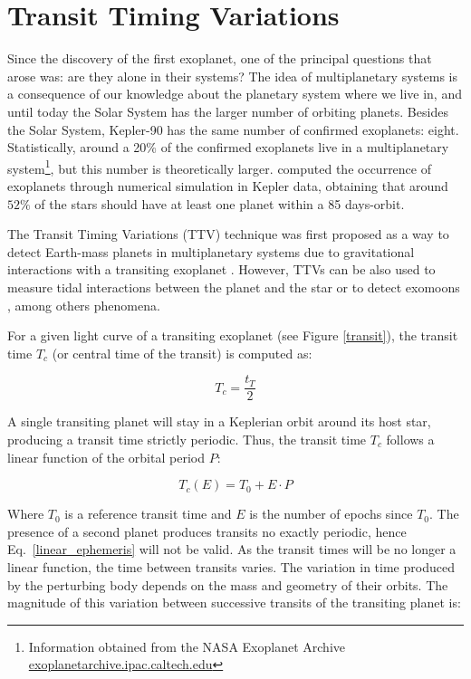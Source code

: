 \section{Transit Timing Variations\label{ttv}}

Since the discovery of the first exoplanet, one of the principal questions that arose was: are they alone in their systems? The idea of multiplanetary systems is a consequence of our knowledge about the planetary system where we live in, and until today the Solar System has the larger number of orbiting planets. Besides the Solar System, Kepler-90 has the same number of confirmed exoplanets: eight. Statistically, around a 20\% of the confirmed exoplanets live in a multiplanetary system\footnote{Information obtained from the NASA Exoplanet Archive \url{exoplanetarchive.ipac.caltech.edu}}, but this number is theoretically larger. \cite{Fressin2013} computed the occurrence of exoplanets through numerical simulation in Kepler data, obtaining that around $52\%$ of the stars should have at least one planet within a 85 days-orbit.

The Transit Timing Variations (TTV) technique was first proposed as a way to detect Earth-mass planets in multiplanetary systems due to gravitational interactions with a transiting exoplanet \citep{Holman2005,Agol2005}. However, TTVs can be also used to measure tidal interactions between the planet and the star or to detect exomoons \citep{Kipping2009a,Kipping2009b}, among others phenomena. 

For a given light curve of a transiting exoplanet (see Figure \ref{transit}), the transit time $T_{c}$ (or central time of the transit) is computed as:

\begin{equation}
T_{c} = \frac{t_T}{2}
\end{equation}

A single transiting planet will stay in a Keplerian orbit around its host star, producing a transit time strictly periodic. Thus, the transit time $T_c$ follows a linear function of the orbital period $P$: 

\begin{equation}
T_{c}(E) = T_{0} + E \cdot P
\label{linear_ephemeris} 
\end{equation}

Where $T_0$ is a reference transit time and $E$ is the number of epochs since $T_0$.  The presence of a second planet produces transits no exactly periodic, hence Eq.~\ref{linear_ephemeris} will not be valid. As the transit times will be no longer a linear function,  the time between  transits varies.  The variation in time produced by the perturbing body depends on the mass and geometry of their orbits. The magnitude of this variation between successive transits of the transiting planet is:


